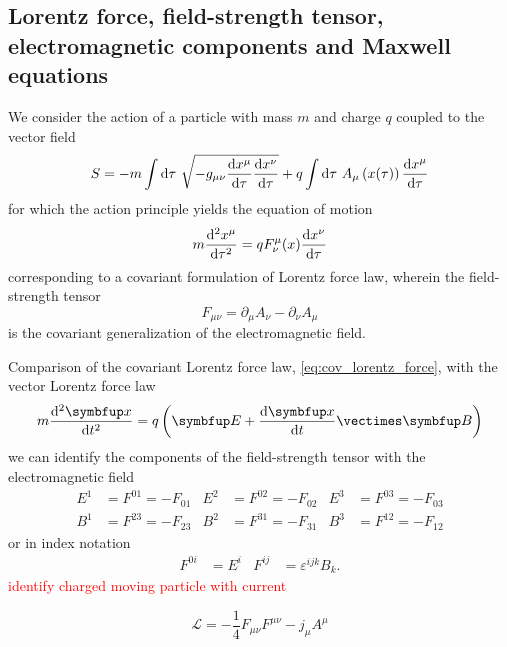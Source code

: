 \subsection{Lorentz force, field-strength tensor, electromagnetic components and Maxwell equations}

We consider the action of a particle with mass $m$ and charge $q$ coupled to the vector field~\cite[p.~244]{Zee2013}
\begin{equation}
	S
	=
	-
	m\int\dd{\tau}
	\sqrt{-g_{\mu\nu}\odv{x^\mu}{\tau}\odv{x^\nu}{\tau}}
	+
	q\int\dd{\tau}
	A_\mu\left(x(\tau)\right)
	\odv{x^\mu}{\tau}
\end{equation}
for which the action principle yields the equation of motion
\begin{equation}
	m
	\odv[order={2}]{x^\mu}{\tau}
	=
	qF^\mu_\nu(x)\odv{x^\nu}{\tau}
	\label{eq:cov_lorentz_force}
\end{equation}
corresponding to a covariant formulation of Lorentz force law, wherein the field-strength tensor
\begin{equation}
	F_{\mu\nu}
	=
	\partial_\mu
	A_\nu
	-
	\partial_\nu
	A_\mu
\end{equation}
is the covariant generalization of the electromagnetic field.

Comparison of the covariant Lorentz force law, \cref{eq:cov_lorentz_force}, with the vector Lorentz force law
\begin{equation}
	m
	\odv[order={2}]{\vb{x}}{t}
	=
	q\left(
		\vb{E}
		+
		\odv{\vb{x}}{t}
		\vcross
		\vb{B}
	\right)
\end{equation}
we can identify the components of the field-strength tensor with the electromagnetic field~\cite[p.~245]{Zee2013}
\begin{align}
	E^1
	&=
	F^{01}
	=
	-
	F_{01}
	&
	E^2
	&=
	F^{02}
	=
	-
	F_{02}
	&
	E^3
	&=
	F^{03}
	=
	-
	F_{03}
	\\
	B^1
	&=
	F^{23}
	=
	-
	F_{23}
	&
	B^2
	&=
	F^{31}
	=
	-
	F_{31}
	&
	B^3
	&=
	F^{12}
	=
	-
	F_{12}
\end{align}
or in index notation~\cite[p.~336]{Srednicki2007}
\begin{align}
	F^{0i}
	&=
	E^i
	&
	F^{ij}
	&=
	\varepsilon^{ijk}
	B_k
	.
\end{align}
\textcolor{red}{identify charged moving particle with current}

\begin{equation}
	\mathcal{L}
	=
	-
	\frac{1}{4}
	F_{\mu\nu}
	F^{\mu\nu}
	-
	j_\mu A^\mu
\end{equation}

